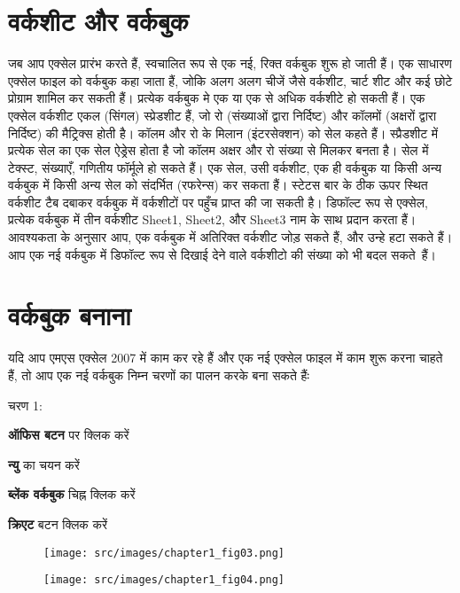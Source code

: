 \section{वर्कशीट और वर्कबुक}\label{id-1.2}

जब आप एक्सेल प्रारंभ करते हैं, स्वचालित रूप से एक नई, रिक्त वर्कबुक शुरू हो जाती हैं। एक साधारण एक्सेल फाइल को वर्कबुक कहा जाता हैं, जोकि अलग अलग चीजें जैसे वर्कशीट, चार्ट शीट और कई छोटे प्रोग्राम शामिल कर सकती हैं। प्रत्येक वर्कबुक मे एक या एक से अधिक वर्कशीटे हो सकती हैं। एक एक्सेल वर्कशीट एकल (सिंगल) स्प्रेडशीट हैं, जो रो (संख्याओं द्वारा निर्दिष्ट) और कॉलमों (अक्षरों द्वारा निर्दिष्ट) की मैट्रिक्स होती है। कॉलम और रो के मिलान (इंटरसेक्शन) को सेल कहते हैं। स्प्रैडशीट में प्रत्येक सेल का एक सेल ऐड्रेस होता है जो कॉलम अक्षर और रो संख्या से मिलकर बनता है। सेल में टेक्स्ट, संख्याएँ, गणितीय फॉर्मूले हो सकते हैं। एक सेल, उसी वर्कशीट, एक ही वर्कबुक या किसी अन्य वर्कबुक में किसी अन्य सेल को संदर्भित (रफरेन्स) कर सकता हैं। स्टेटस बार के ठीक ऊपर स्थित वर्कशीट टैब दबाकर वर्कबुक में वर्कशीटों पर पहुँच प्राप्त की जा सकती है। डिफॉल्ट रूप से एक्सेल, प्रत्येक वर्कबुक में तीन वर्कशीट {\rm Sheet1, Sheet2,} और {\rm Sheet3} नाम के साथ प्रदान करता हैं। आवश्यकता के अनुसार आप, एक वर्कबुक में अतिरिक्त वर्कशीट जोड़ सकते हैं, और उन्हे हटा सकते हैं। आप एक नई वर्कबुक में डिफॉल्ट रूप से दिखाई देने वाले वर्कशीटो की संख्या को भी बदल सकते~हैं। 

\section{वर्कबुक बनाना}\label{id-1.3}

यदि आप एमएस एक्सेल 2007 में काम कर रहे हैं और एक नई एक्सेल फाइल में काम शुरू करना चाहते हैं, तो आप एक नई वर्कबुक निम्न चरणों का पालन करके बना सकते हैंः 
\begin{descriptionSimple}{चरण 1:}
\item[चरण 1] \textbf{ऑफिस बटन} पर क्लिक करें
\item[चरण 2] \textbf{न्यु} का चयन करें
\item[चरण 3] \textbf{ब्लेंक वर्कबुक} चिह्न क्लिक करें
\item[चरण 4] \textbf{क्रिएट} बटन क्लिक करें
\end{descriptionSimple}
\begin{figure}[H]
\centering
\texttt{[image: src/images/chapter1\_fig03.png]}
\end{figure}
\begin{figure}[H]
\centering
\texttt{[image: src/images/chapter1\_fig04.png]}
\end{figure}

